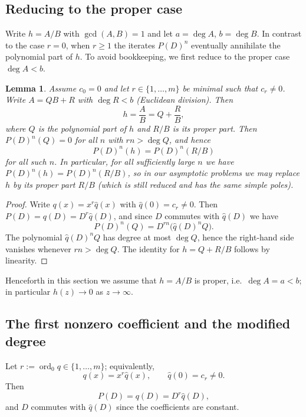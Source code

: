 \documentclass[12pt]{article}
\theoremstyle{plain}
\newtheorem{lemma}[theorem]{Lemma}
\theoremstyle{definition}
\begin{document}
\subsection{Reducing to the proper case}

Write $h=A/B$ with $\gcd(A,B)=1$ and let $a=\deg A$, $b=\deg B$.
In contrast to the case $r=0$, when $r\ge1$ the iterates $P(D)^n$ eventually annihilate the polynomial part of $h$.
To avoid bookkeeping, we first reduce to the proper case $\deg A<b$.

\begin{lemma}\label{lem:kill_poly_part}
Assume $c_0=0$ and let $r\in\{1,\dots,m\}$ be minimal such that $c_r\neq0$.
Write $A=QB+R$ with $\deg R<b$ (Euclidean division). Then
$$h=\frac{A}{B}=Q+\frac{R}{B},$$
where $Q$ is the polynomial part of $h$ and $R/B$ is its proper part.
Then $P(D)^n(Q)=0$ for all $n$ with $rn>\deg Q$, and hence
$$P(D)^n(h)=P(D)^n(R/B)$$
for all such $n$.
In particular, for all sufficiently large $n$ we have $P(D)^n(h)=P(D)^n(R/B)$, so in our asymptotic problems we may replace $h$ by its proper part $R/B$ (which is still reduced and has the same simple poles).
\end{lemma}

\begin{proof}
Write $q(x)=x^r\widehat q(x)$ with $\widehat q(0)=c_r\neq0$.
Then $P(D)=q(D)=D^r\widehat q(D)$, and since $D$ commutes with $\widehat q(D)$ we have
$$P(D)^n(Q)=D^{rn}\bigl(\widehat q(D)^nQ\bigr).$$
The polynomial $\widehat q(D)^nQ$ has degree at most $\deg Q$, hence the right-hand side vanishes whenever $rn>\deg Q$.
The identity for $h=Q+R/B$ follows by linearity.
\end{proof}

Henceforth in this section we assume that $h=A/B$ is proper, i.e.\ $\deg A=a<b$; in particular $h(z)\to0$ as $z\to\infty$.

\subsection{The first nonzero coefficient and the modified degree}

Let $r:=\operatorname{ord}_0 q\in\{1,\dots,m\}$; equivalently,
\begin{equation}\label{eq:r_def}
q(x)=x^r\widehat q(x),\qquad \widehat q(0)=c_r\neq0.
\end{equation}
Then
$$P(D)=q(D)=D^{r}\widehat q(D),$$
and $D$ commutes with $\widehat q(D)$ since the coefficients are constant.
\end{document}
